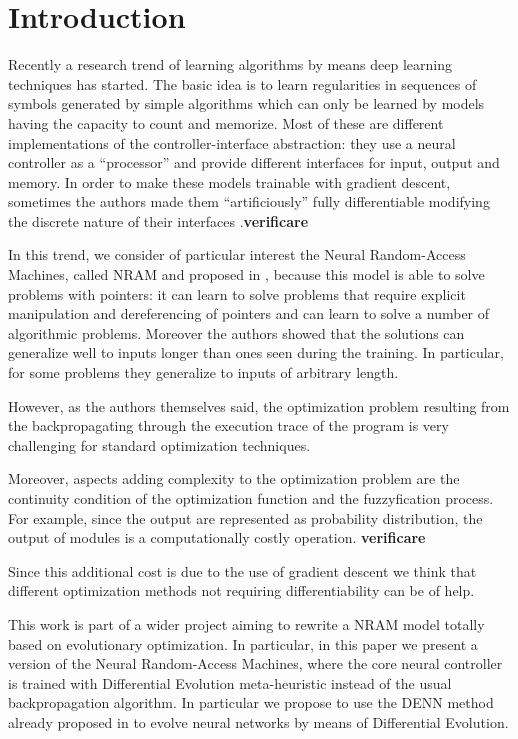 \section{Introduction}

Recently a research trend of learning algorithms \cite{Graves2014NeuralTM,greve2016evolving,Joulin2015InferringAP,NRAM:2016,zaremba:2016,zaremba:2015} by means deep learning techniques has started. The basic idea is to learn regularities in sequences of symbols generated by simple algorithms which can only be learned by models having the capacity to count and memorize.
Most of these are different implementations of the controller-interface abstraction: they use a neural controller as a ``processor'' and provide different interfaces for input, output and memory. In order to make these models trainable with gradient descent, sometimes the authors made them ``artificiously'' fully differentiable modifying the discrete nature of their interfaces \cite{Graves2014NeuralTM,NRAM:2016}.{\bf verificare}

In this trend, we consider of particular interest the Neural Random-Access Machines, called NRAM and proposed in \cite{NRAM:2016},
because this model is able to solve problems with pointers:
it can learn to solve problems
that require explicit manipulation and dereferencing of pointers and can learn to solve a number of algorithmic problems. Moreover the authors showed that the solutions can generalize well
to inputs longer than ones seen during the training. In particular, for some problems they generalize
to inputs of arbitrary length.

However, as the authors themselves said, the optimization problem resulting from the backpropagating through the
execution trace of the program is very challenging for standard optimization techniques.  

Moreover, aspects adding complexity to the optimization problem are the continuity condition of the optimization function and the fuzzyfication process. For example, since the output are represented as probability distribution, the output of modules is a computationally costly operation. {\bf verificare}

Since this additional cost is due to the use of gradient descent we think that different optimization methods not requiring differentiability can be of help. 

This work is part of a wider project aiming to rewrite a NRAM model totally based on evolutionary optimization. 
In particular, in this paper we present a version of the Neural Random-Access Machines, where the core neural controller is trained with Differential Evolution meta-heuristic instead of the usual backpropagation algorithm.
In particular we propose to use the DENN method already proposed in \cite{denn2017mod} to evolve neural networks by means of Differential Evolution.

